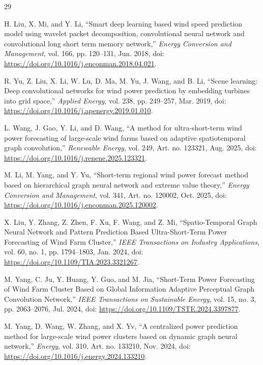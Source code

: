 \begin{thebibliography}{29}

H. Liu, X. Mi, and Y. Li, ``Smart deep learning based wind speed prediction model using wavelet packet decomposition, convolutional neural network and convolutional long short term memory network,'' \textit{Energy Conversion and Management}, vol. 166, pp. 120--131, Jun. 2018, doi: \url{https://doi.org/10.1016/j.enconman.2018.04.021}.

R. Yu, Z. Liu, X. Li, W. Lu, D. Ma, M. Yu, J. Wang, and B. Li, ``Scene learning: Deep convolutional networks for wind power prediction by embedding turbines into grid space,'' \textit{Applied Energy}, vol. 238, pp. 249--257, Mar. 2019, doi: \url{https://doi.org/10.1016/j.apenergy.2019.01.010}.

L. Wang, J. Gao, Y. Li, and D. Wang, ``A method for ultra-short-term wind power forecasting of large-scale wind farms based on adaptive spatiotemporal graph convolution,'' \textit{Renewable Energy}, vol. 249, Art. no. 123321, Aug. 2025, doi: \url{https://doi.org/10.1016/j.renene.2025.123321}.

M. Li, M. Yang, and Y. Yu, ``Short-term regional wind power forecast method based on hierarchical graph neural network and extreme value theory,'' \textit{Energy Conversion and Management}, vol. 341, Art. no. 120002, Oct. 2025, doi: \url{https://doi.org/10.1016/j.enconman.2025.120002}.

X. Liu, Y. Zhang, Z. Zhen, F. Xu, F. Wang, and Z. Mi, ``Spatio-Temporal Graph Neural Network and Pattern Prediction Based Ultra-Short-Term Power Forecasting of Wind Farm Cluster,'' \textit{IEEE Transactions on Industry Applications}, vol. 60, no. 1, pp. 1794--1803, Jan. 2024, doi: \url{https://doi.org/10.1109/TIA.2023.3321267}.

M. Yang, C. Ju, Y. Huang, Y. Guo, and M. Jia, ``Short-Term Power Forecasting of Wind Farm Cluster Based on Global Information Adaptive Perceptual Graph Convolution Network,'' \textit{IEEE Transactions on Sustainable Energy}, vol. 15, no. 3, pp. 2063--2076, Jul. 2024, doi: \url{https://doi.org/10.1109/TSTE.2024.3397877}.

M. Yang, D. Wang, W. Zhang, and X. Yv, ``A centralized power prediction method for large-scale wind power clusters based on dynamic graph neural network,'' \textit{Energy}, vol. 310, Art. no. 133210, Nov. 2024, doi: \url{https://doi.org/10.1016/j.energy.2024.133210}.


\end{thebibliography}
